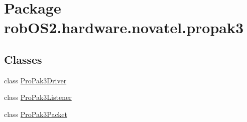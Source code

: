 \hypertarget{namespacerob_o_s2_1_1hardware_1_1novatel_1_1propak3}{
\section{Package robOS2.hardware.novatel.propak3}
\label{namespacerob_o_s2_1_1hardware_1_1novatel_1_1propak3}
}
\subsection*{Classes}
\begin{DoxyCompactItemize}
\item 
class \hyperlink{classrob_o_s2_1_1hardware_1_1novatel_1_1propak3_1_1_pro_pak3_driver}{ProPak3Driver}
\item 
class \hyperlink{classrob_o_s2_1_1hardware_1_1novatel_1_1propak3_1_1_pro_pak3_listener}{ProPak3Listener}
\item 
class \hyperlink{classrob_o_s2_1_1hardware_1_1novatel_1_1propak3_1_1_pro_pak3_packet}{ProPak3Packet}
\end{DoxyCompactItemize}
